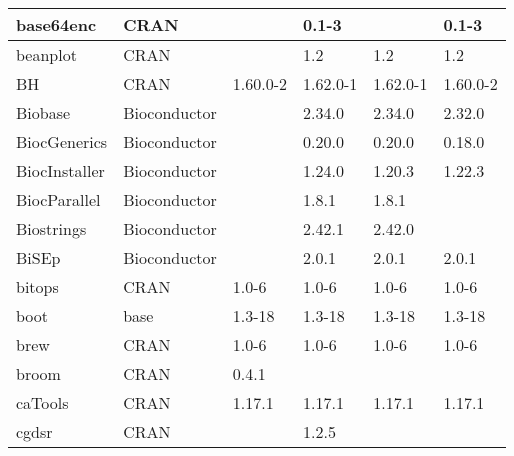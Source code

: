 \begin{longtable}{|llllll|}
base64enc                     & CRAN                      &             & 0.1-3       &                & 0.1-3            \\ \hline
beanplot                      & CRAN                      &             & 1.2         & 1.2            & 1.2               \\ \hline \rowcolor{gray!25}
BH                            & CRAN                      & 1.60.0-2    & 1.62.0-1    & 1.62.0-1       & 1.60.0-2         \\ \hline
Biobase                       & Bioconductor              &             & 2.34.0      & 2.34.0         & 2.32.0            \\ \hline \rowcolor{gray!25}
BiocGenerics                  & Bioconductor              &             & 0.20.0      & 0.20.0         & 0.18.0           \\ \hline
BiocInstaller                 & Bioconductor              &             & 1.24.0      & 1.20.3         & 1.22.3            \\ \hline \rowcolor{gray!25}
BiocParallel                  & Bioconductor              &             & 1.8.1       & 1.8.1          &                  \\ \hline
Biostrings                    & Bioconductor              &             & 2.42.1      & 2.42.0         &                   \\ \hline \rowcolor{gray!25}
BiSEp                         & Bioconductor              &             & 2.0.1       & 2.0.1          & 2.0.1            \\ \hline
bitops                        & CRAN                      & 1.0-6       & 1.0-6       & 1.0-6          & 1.0-6             \\ \hline \rowcolor{gray!25}
boot                          & base                      & 1.3-18      & 1.3-18      & 1.3-18         & 1.3-18           \\ \hline
brew                          & CRAN                      & 1.0-6       & 1.0-6       & 1.0-6          & 1.0-6             \\ \hline \rowcolor{gray!25}
broom                         & CRAN                      & 0.4.1       &             &                &                  \\ \hline
caTools                       & CRAN                      & 1.17.1      & 1.17.1      & 1.17.1         & 1.17.1            \\ \hline \rowcolor{gray!25}
cgdsr                         & CRAN                      &             & 1.2.5       &                &                  \\ \hline

\end{longtable}
